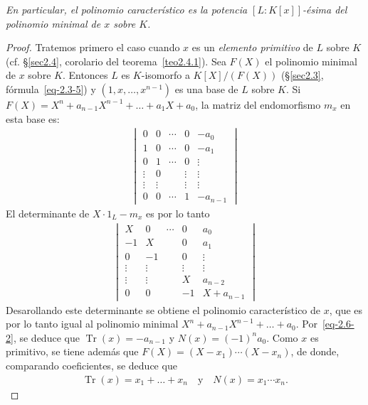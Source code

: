 \documentclass[oneside,bibtotoc,leqno,spanish]{amsbook}
\DeclareMathOperator{\Tr}{Tr}
\numberwithin{equation}{section}
\newenvironment{comm}%
	{\begin{trivlist}\item\small\itshape}
	{\end{trivlist}}
\theoremstyle{defi}
\theoremstyle{note}
\theoremstyle{rem}
\numberwithin{theorem}{section}
\numberwithin{proposition}{section}
\numberwithin{definition}{section}
\numberwithin{lemma}{section}
\numberwithin{corollary}{section}
\numberwithin{example}{section}
\numberwithin{footnote}{section}%
\begin{document}
\begin{comm}
En particular, el polinomio caracter\'istico es la potencia $[L:K[x]]$-\'esima del
polinomio minimal de $x$
sobre $K$.
\end{comm}

\begin{proof}
Tratemos primero el caso cuando $x$ es un {\em elemento primitivo} de $L$ sobre $K$
(cf. \S\ref{sec2.4}, corolario del teorema~\ref{teo2.4.1}).
Sea $F(X)$ el polinomio minimal de $x$ sobre $K$. Entonces $L$ es $K$-isomorfo a
$K[X]/(F(X))$ (\S\ref{sec2.3}, f\'ormula~\eqref{eq-2.3-5})
y $(1,x,\dots,x^{n-1})$ es una base de $L$ sobre $K$. Si
$F(X) = X^{n}+a_{n-1}X^{n-1}+\dots+a_{1}X+a_{0}$,
la matriz del endomorfismo $m_{x}$ en esta base es:
\begin{gather*}
\begin{vmatrix}
0 & 0 & \cdots & 0 & -a_{0}\\
1 & 0 & \cdots & 0 & -a_{1}\\
0 & 1 & \cdots & 0 & \vdots\\
\vdots & 0 & & \vdots & \vdots\\
\vdots & \vdots & & \vdots & \vdots\\
0 & 0 & \cdots & 1 & -a_{n-1}
\end{vmatrix}
\end{gather*}
El determinante de $X\cdot 1_{L}-m_{x}$ es por lo tanto
\begin{gather*}
\begin{vmatrix}
X & 0 & \cdots & 0 & a_{0}\\
-1 & X & & 0 & a_{1}\\
0 & -1 & & 0 & \vdots\\
\vdots & \vdots & & \vdots & \vdots\\
\vdots & \vdots & & X & a_{n-2}\\
0 & 0 & & -1 & X+a_{n-1}
\end{vmatrix}
\end{gather*}
Desarollando este determinante se obtiene el polinomio caracter\'istico de $x$, que es por lo tanto igual
al polinomio minimal $X^{n}+a_{n-1}X^{n-1}+\dots+a_{0}$. Por~\eqref{eq-2.6-2}, se deduce que $\Tr(x) = -a_{n-1}$
y $N(x) = (-1)^{n}a_{0}$. Como $x$ es primitivo, se tiene adem\'as que $F(X) = (X-x_{1})\cdots(X-x_{n})$, de
donde, comparando coeficientes, se deduce que
\begin{gather*}
\Tr(x) = x_{1}+\dots+x_{n}\quad\text{y}\quad N(x) = x_{1}\cdots x_{n}.
\end{gather*}


\end{proof}
\end{document}
